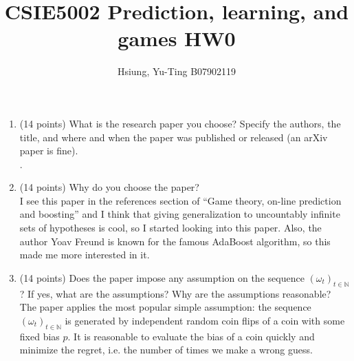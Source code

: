 \documentclass[a4paper, 12pt]{article}
\title{CSIE5002 Prediction, learning, and games HW0}
\author{Hsiung, Yu-Ting B07902119}
\newcommand{\N}{\mathbb{N}}
\begin{document}
\maketitle

\begin{enumerate}
    \item (14 points) What is the research paper you choose? Specify the authors, the title, and where and when the paper was published or released (an arXiv paper is fine).
    \\ {\color{blue} .}
    \item (14 points) Why do you choose the paper?
    \\ {\color{blue} I see this paper in the references section of ``Game theory, on-line prediction and boosting'' \cite{freund1996game} and I think that giving generalization to uncountably infinite sets of hypotheses is cool, so I started looking into this paper. Also, the author Yoav Freund is known for the famous AdaBoost algorithm, so this made me more interested in it.}
    \item (14 points) Does the paper impose any assumption on the sequence $(\omega_t)_{t \in \N}$? If yes, what are the assumptions? Why are the assumptions reasonable?
    \\ {\color{blue} The paper applies the most popular simple assumption: the sequence $(\omega_t)_{t \in \N}$ is generated by independent random coin flips of a coin with some fixed bias $p$. It is reasonable to evaluate the bias of a coin quickly and minimize the regret, i.e. the number of times we make a wrong guess.}


\end{enumerate}
\end{document}

